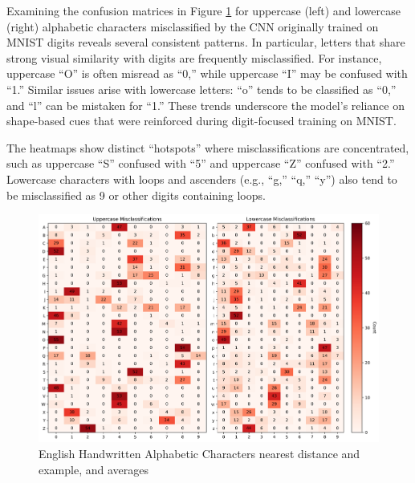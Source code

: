 

Examining the confusion matrices in Figure \ref {fig:english_handwritten_characters_x_confusion_matrix} for uppercase (left) and lowercase (right) alphabetic characters misclassified by the CNN originally trained on MNIST digits reveals several consistent patterns. In particular, letters that share strong visual similarity with digits are frequently misclassified. For instance, uppercase “O” is often misread as “0,” while uppercase “I” may be confused with “1.” Similar issues arise with lowercase letters: “o” tends to be classified as “0,” and “l” can be mistaken for “1.” These trends underscore the model’s reliance on shape-based cues that were reinforced during digit-focused training on MNIST.

The heatmaps show distinct “hotspots” where misclassifications are concentrated, such as uppercase “S” confused with “5” and uppercase “Z” confused with “2.” Lowercase characters with loops and ascenders (e.g., “g,” “q,” “y”) also tend to be misclassified as 9 or other digits containing loops. 

\begin{figure}[ht]
    \centering
    \includegraphics[width=0.99\columnwidth]{Figures/Results/HandwrittenCharacters/english_handwritten_characters_x_confusion_matrix.png}
    \caption{English Handwritten Alphabetic Characters nearest distance and example, and averages}
\label{fig:english_handwritten_characters_x_confusion_matrix}
\end{figure}

